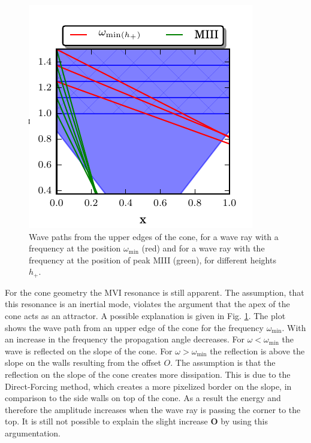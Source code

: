 \begin{figure}[!t]
  \begin{minipage}[c]{0.4\textwidth}
      \centering
      \includegraphics{gfx/cone/discussion/corners.pdf}
  \end{minipage}
  \hfill
  \begin{minipage}[c]{0.5\textwidth}
      \caption{\label{fig:conediscuss:corners}
        Wave paths from the upper edges of the cone,
        for a wave ray with a frequency at the position $\omega_{\text{min}}$ (red) and
        for a wave ray with the frequency at the position of peak M\RN{3} (green),
            for different heights $h_+$.
      }
  \end{minipage}
\end{figure}



For the cone geometry the M\RN{6} resonance is still apparent.
The assumption, that this resonance is an inertial mode,
violates the argument that the apex of the cone acts as
an attractor.
A possible explanation is given in Fig. \ref{fig:conediscuss:corners}.
The plot shows the wave path from an upper edge of the cone for the frequency $\omega_{\text{min}}$.
With an increase in the frequency the propagation angle decreases.
For $\omega<\omega_{\text{min}}$ the wave is reflected on the slope of the cone.
For $\omega>\omega_{\text{min}}$ the reflection is above the slope on the walls resulting from the offset $O$.
The assumption is that the reflection on the slope of the cone creates more dissipation.
This is due to the Direct-Forcing method, which creates a more pixelized border on the slope,
in comparison to the side walls on top of the cone.
As a result the energy and therefore the amplitude increases
when the wave ray is passing the corner to the top.
It is still not possible to explain the slight increase \textbf{O} by using this argumentation.

